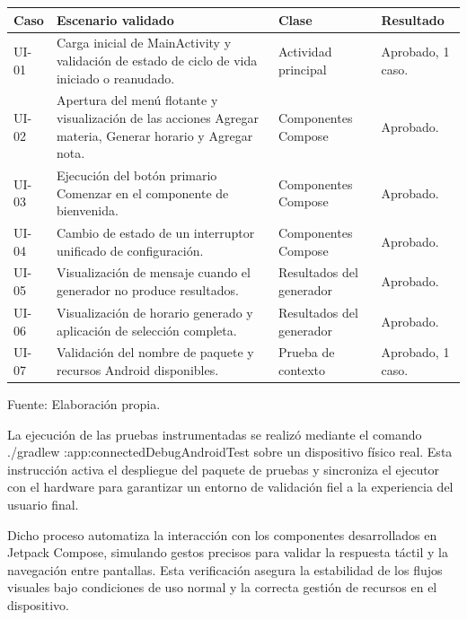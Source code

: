 \begin{enumerate}
\begin{center}
\begin{minipage}{\linewidth}
\centering
\begin{tabularx}{\linewidth}{@{}p{1.7cm}>{\RaggedRight\arraybackslash}X>{\RaggedRight\arraybackslash}p{3.1cm}>{\RaggedRight\arraybackslash}p{2.8cm}@{}}
\toprule
Caso & Escenario validado & Clase & Resultado \\
\midrule
UI-01 & Carga inicial de MainActivity y validación de estado de ciclo de vida iniciado o reanudado. & Actividad principal & Aprobado, 1 caso. \\
UI-02 & Apertura del menú flotante y visualización de las acciones Agregar materia, Generar horario y Agregar nota. & Componentes Compose & Aprobado. \\
UI-03 & Ejecución del botón primario Comenzar en el componente de bienvenida. & Componentes Compose & Aprobado. \\
UI-04 & Cambio de estado de un interruptor unificado de configuración. & Componentes Compose & Aprobado. \\
UI-05 & Visualización de mensaje cuando el generador no produce resultados. & Resultados del generador & Aprobado. \\
UI-06 & Visualización de horario generado y aplicación de selección completa. & Resultados del generador & Aprobado. \\
UI-07 & Validación del nombre de paquete y recursos Android disponibles. & Prueba de contexto & Aprobado, 1 caso. \\
\bottomrule
\end{tabularx}
\label{tab:qa_ui_instrumentadas}
Fuente: Elaboración propia.
\end{minipage}
\end{center}

La ejecución de las pruebas instrumentadas se realizó mediante el comando ./gradlew :app:connectedDebugAndroidTest sobre un dispositivo físico real. Esta instrucción activa el despliegue del paquete de pruebas y sincroniza el ejecutor con el hardware para garantizar un entorno de validación fiel a la experiencia del usuario final.

Dicho proceso automatiza la interacción con los componentes desarrollados en Jetpack Compose, simulando gestos precisos para validar la respuesta táctil y la navegación entre pantallas. Esta verificación asegura la estabilidad de los flujos visuales bajo condiciones de uso normal y la correcta gestión de recursos en el dispositivo.


\end{enumerate}
